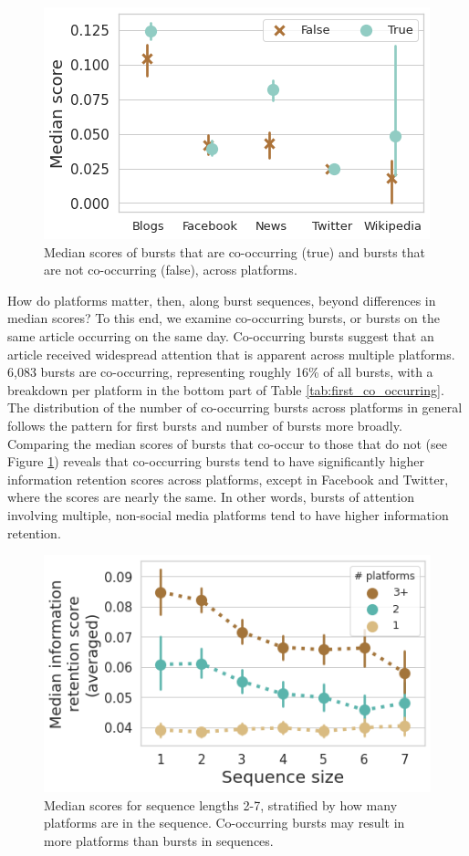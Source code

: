 \documentclass[letterpaper]{article} %
\begin{document}
\begin{figure}[t]
    \centering
    \includegraphics[width=0.8\columnwidth]{figs/fig6.png}
    \caption{Median scores of bursts that are co-occurring (true) and bursts that are not co-occurring (false), across platforms.}
    \label{fig:co_occurring}
\end{figure}

How do platforms matter, then, along burst sequences, beyond differences in median scores?
To this end, we examine co-occurring bursts, or bursts on the same article occurring on the same day. Co-occurring bursts suggest that an article received widespread attention that is apparent across multiple platforms. 6,083 bursts are co-occurring, representing roughly 16\% of all bursts, with a breakdown per platform in the bottom part of Table \ref{tab:first_co_occurring}. The distribution of the number of co-occurring bursts across platforms in general follows the pattern for first bursts and number of bursts more broadly.
Comparing the median scores of bursts that co-occur to those that do not (see Figure \ref{fig:co_occurring}) reveals that co-occurring bursts tend to have significantly higher information retention scores across platforms, except in Facebook and Twitter, where the scores are nearly the same. In other words, bursts of attention involving multiple, non-social media platforms tend to have higher information retention.

\begin{figure}[t]
    \centering
    \includegraphics[width=0.8\columnwidth]{figs/fig7_with6.png}
    \caption{Median scores for sequence lengths 2-7, stratified by how many platforms are in the sequence. Co-occurring bursts may result in more platforms than bursts in sequences.}
    \label{fig:heterogeneity}
\end{figure}
\end{document}
